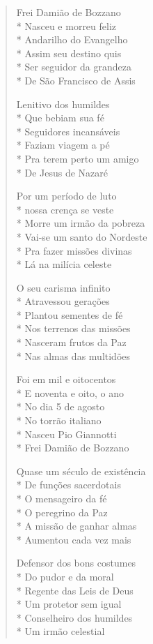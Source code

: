 \begin{verse}
Frei Damião de Bozzano\\*
Nasceu e morreu feliz\\*
Andarilho do Evangelho\\*
Assim seu destino quis\\*
Ser seguidor da grandeza\\*
De São Francisco de Assis

Lenitivo dos humildes\\*
Que bebiam sua fé\\*
Seguidores incansáveis\\*
Faziam viagem a pé\\*
Pra terem perto um amigo\\*
De Jesus de Nazaré

Por um período de luto\\*
nossa crença se veste\\*
Morre um irmão da pobreza\\*
Vai-se um santo do Nordeste\\*
Pra fazer missões divinas\\*
Lá na milícia celeste

O seu carisma infinito\\*
Atravessou gerações\\*
Plantou sementes de fé\\*
Nos terrenos das missões\\*
Nasceram frutos da Paz\\*
Nas almas das multidões

Foi em mil e oitocentos\\*
E noventa e oito, o ano\\*
No dia 5 de agosto\\*
No torrão italiano\\*
Nasceu Pio Giannotti\\*
Frei Damião de Bozzano

Quase um século de existência\\*
De funções sacerdotais\\*
O mensageiro da fé\\*
O peregrino da Paz\\*
A missão de ganhar almas\\*
Aumentou cada vez mais

Defensor dos bons costumes\\*
Do pudor e da moral\\*
Regente das Leis de Deus\\*
Um protetor sem igual\\*
Conselheiro dos humildes\\*
Um irmão celestial


\end{verse}
